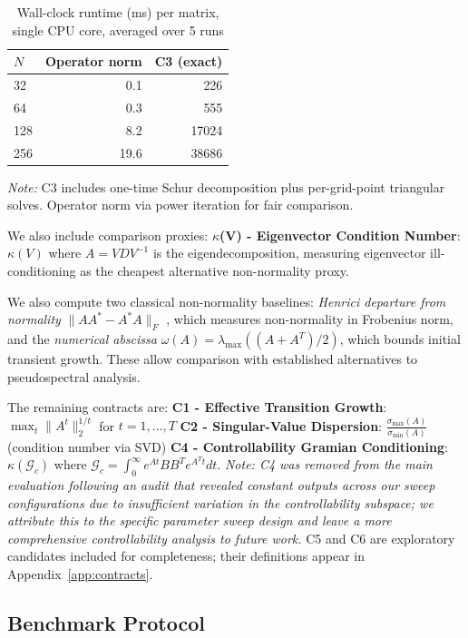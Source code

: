 \documentclass[twoside]{article}
\begin{document}
\begin{table}[H]
\caption{Wall-clock runtime (ms) per matrix, single CPU core, averaged over 5 runs}
\label{tab:runtime}
\centering
\begin{tabular}{lrr}
\toprule
$N$ & Operator norm & C3 (exact) \\
\midrule
32 & 0.1 & 226 \\
64 & 0.3 & 555 \\
128 & 8.2 & 17024 \\
256 & 19.6 & 38686 \\
\bottomrule
\end{tabular}
\par\smallskip
{\footnotesize \textit{Note:} C3 includes one-time Schur decomposition plus per-grid-point
triangular solves. Operator norm via power iteration for fair comparison.}
\end{table}

We also include comparison proxies:
\textbf{$\kappa$(V) - Eigenvector Condition Number}: $\kappa(V)$ where $A = VDV^{-1}$ is the eigendecomposition, measuring eigenvector ill-conditioning as the cheapest alternative non-normality proxy.

We also compute two classical non-normality baselines: \textit{Henrici departure from normality} $\|AA^* - A^*A\|_F$ \citep{henrici1962bounds}, which measures non-normality in Frobenius norm, and the \textit{numerical abscissa} $\omega(A) = \lambda_{\max}((A + A^T)/2)$, which bounds initial transient growth. These allow comparison with established alternatives to pseudospectral analysis.

The remaining contracts are:
\textbf{C1 - Effective Transition Growth}: $\max_t \|A^t\|_2^{1/t}$ for $t = 1, \ldots, T$
\textbf{C2 - Singular-Value Dispersion}: $\frac{\sigma_{\max}(A)}{\sigma_{\min}(A)}$ (condition number via SVD)
\textbf{C4 - Controllability Gramian Conditioning}: $\kappa(\mathcal{G}_c)$ where $\mathcal{G}_c = \int_0^{\infty} e^{At}BB^Te^{A^Tt}dt$. \textit{Note: C4 was removed from the main evaluation following an audit that revealed constant outputs across our sweep configurations due to insufficient variation in the controllability subspace; we attribute this to the specific parameter sweep design and leave a more comprehensive controllability analysis to future work.}
C5 and C6 are exploratory candidates included for completeness; their definitions appear in Appendix~\ref{app:contracts}.

\subsection{Benchmark Protocol}
\label{sec:benchmark-protocol}
\end{document}
